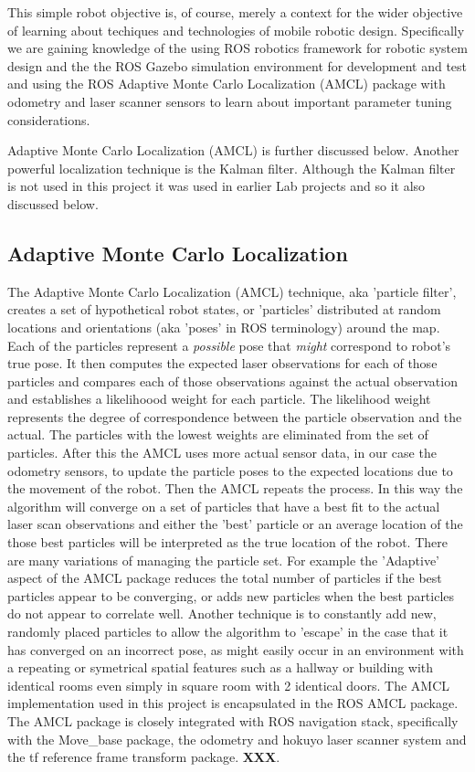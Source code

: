 \documentclass[10pt,journal,compsoc]{IEEEtran}
\begin{document}
This simple robot objective is, of course, merely a context for the wider objective of learning about techiques and technologies of mobile robotic design. Specifically we are gaining knowledge of the using ROS robotics framework for robotic system design and the the ROS Gazebo simulation environment for development and test and using the ROS Adaptive Monte Carlo Localization (AMCL) package with odometry and laser scanner sensors to learn about important parameter tuning considerations. 

Adaptive Monte Carlo Localization (AMCL) is further discussed below. 
Another powerful localization technique is the Kalman filter. Although the Kalman filter is not used in this project it was used in earlier Lab projects and so it also discussed below.

\subsection{Adaptive Monte Carlo Localization}
The Adaptive Monte Carlo Localization (AMCL) technique, aka 'particle filter', creates a set of hypothetical robot states, or 'particles' distributed at random locations and orientations (aka 'poses' in ROS terminology) around the map. Each of the particles represent a \textit{possible} pose that \textit{ might} correspond to robot's true pose. It then computes the expected laser observations for each of those particles and compares each of those observations against the actual observation and establishes a likelihoood weight for each particle. The likelihood weight represents the degree of correspondence between the particle observation and the actual. The particles with the lowest weights are eliminated from the set of particles. After this the AMCL uses more actual sensor data, in our case the odometry sensors, to update the particle poses to the expected locations due to the movement of the robot. Then the AMCL repeats the process. In this way the algorithm will converge on a set of particles that have a best fit to the actual laser scan observations and either the 'best' particle or an average location of the those best particles will be interpreted as the true location of the robot.
There are many variations of managing the particle set. For example the 'Adaptive' aspect of the AMCL package reduces the total number of particles if the best particles appear to be converging, or adds new particles when the best particles do not appear to correlate well. Another technique is to constantly add new, randomly placed particles to allow the algorithm to 'escape' in the case that it has converged on an incorrect pose, as might easily occur in an environment with a repeating or symetrical spatial features such as a hallway or building with identical rooms even simply in square room with 2 identical doors.
\hfill \vspace{\baselineskip}
The AMCL implementation used in this project is encapsulated in the ROS AMCL package. The AMCL package is closely integrated with ROS navigation stack, specifically with the Move\_base package, the odometry and hokuyo laser scanner system and the tf reference frame transform package. \textbf{ XXX}.
\end{document}
